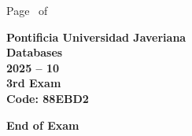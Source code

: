 \documentclass[11pt, addpoints]{exam}\usepackage[utf8]{inputenc}
\begin{document}
\begin{coverpages}
\begin{center}
			\vspace{3mm}
			\leavevmode \hspace{5mm} 
		\end{center}
	\end{coverpages}

	\footer{} {Page \thepage\ of \numpages} {}

	\centering
	\textbf{\Large Pontificia Universidad Javeriana}\\
	\textbf{\Large Databases} \\
	\textbf{\large 2025 -- 10} \\
	\textbf{\large 3rd Exam} \\
	\textbf{Code: 88EBD2}


	\begin{questions}
		
		
		
		
		
		
		
		
		
		
		
		
		
		
		
		
		
		
		
		
	\end{questions}

	\vspace{5mm}
	\noindent \textbf{End of Exam}
\end{document}
